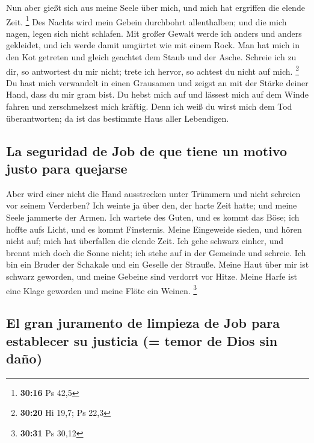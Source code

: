  Nun aber gießt sich aus meine Seele über mich, und mich
hat ergriffen die elende Zeit. \footnote{\textbf{30:16} Ps 42,5}
 Des Nachts wird mein Gebein durchbohrt allenthalben; und
die mich nagen, legen sich nicht schlafen.  Mit großer
Gewalt werde ich anders und anders gekleidet, und ich werde damit
umgürtet wie mit einem Rock.  Man hat mich in den Kot
getreten und gleich geachtet dem Staub und der Asche. 
Schreie ich zu dir, so antwortest du mir nicht; trete ich hervor, so
achtest du nicht auf mich. \footnote{\textbf{30:20} Hi 19,7; Ps 22,3}
 Du hast mich verwandelt in einen Grausamen und zeigst an
mit der Stärke deiner Hand, dass du mir gram bist.  Du
hebst mich auf und lässest mich auf dem Winde fahren und zerschmelzest
mich kräftig.  Denn ich weiß du wirst mich dem Tod
überantworten; da ist das bestimmte Haus aller Lebendigen.

\hypertarget{la-seguridad-de-job-de-que-tiene-un-motivo-justo-para-quejarse}{%
\subsection{La seguridad de Job de que tiene un motivo justo para
quejarse}\label{la-seguridad-de-job-de-que-tiene-un-motivo-justo-para-quejarse}}

 Aber wird einer nicht die Hand ausstrecken unter
Trümmern und nicht schreien vor seinem Verderben?  Ich
weinte ja über den, der harte Zeit hatte; und meine Seele jammerte der
Armen.  Ich wartete des Guten, und es kommt das Böse; ich
hoffte aufs Licht, und es kommt Finsternis.  Meine
Eingeweide sieden, und hören nicht auf; mich hat überfallen die elende
Zeit.  Ich gehe schwarz einher, und brennt mich doch die
Sonne nicht; ich stehe auf in der Gemeinde und schreie. 
Ich bin ein Bruder der Schakale und ein Geselle der Strauße.
 Meine Haut über mir ist schwarz geworden, und meine
Gebeine sind verdorrt vor Hitze.  Meine Harfe ist eine
Klage geworden und meine Flöte ein Weinen. \footnote{\textbf{30:31} Ps
  30,12}

\hypertarget{el-gran-juramento-de-limpieza-de-job-para-establecer-su-justicia-temor-de-dios-sin-dauxf1o}{%
\subsection{El gran juramento de limpieza de Job para establecer su
justicia (= temor de Dios sin
daño)}\label{el-gran-juramento-de-limpieza-de-job-para-establecer-su-justicia-temor-de-dios-sin-dauxf1o}}

